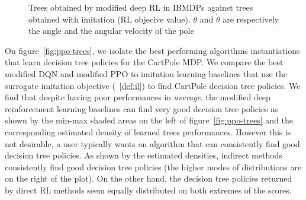 \begin{figure}
    \caption{Trees obtained by modified deep RL in IBMDPs against trees obtained with imitation (RL objecive value). $\theta$ and $\dot{\theta}$ are respectively the angle and the angular velocity of the pole}
    \label{fig:trees-drl}
\end{figure}


On figure~\ref{fig:ppo-trees}, we isolate the best performing algorithms instantiations that learn decision tree policies for the CartPole MDP.
We compare the best modified DQN and modified PPO to imitation learning baselines that use the surrogate imitation objective (~\ref{def:il}) to find CartPole decision tree policies.
We find that despite having poor performances in \textit{average}, the modified deep reinforcement learning baselines can find very good decision tree policies as shown by the min-max shaded areas on the left of figure~\ref{fig:ppo-trees} and the corresponding estimated density of learned trees performances.
However this is not desirable, a user typically wants an algorithm that can consistently find good decision tree policies.
As shown by the estimated densities, indirect methods consistently find good decision tree policies (the higher modes of distributions are on the right of the plot).
On the other hand, the decision tree policies returned by direct RL methods seem equally distributed on both extremes of the scores.

